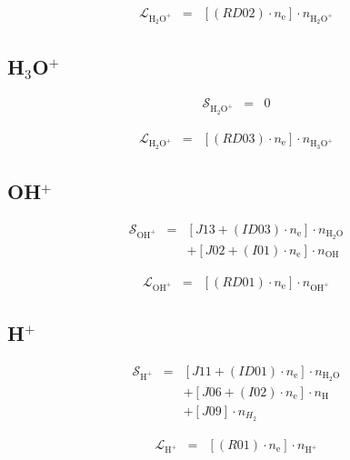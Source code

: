 \documentclass[12pt, letterpaper]{article}
\begin{document}
\begin{eqnarray}
\mathcal{L}_{\text{H}_{2}\text{O}^{+}} & = & \left[ \left( RD02 \right) \cdot n_{\text{e}} \right] \cdot n_{\text{H}_{2} \text{O}^{+}}
\end{eqnarray}

\subsection{H$_{3}$O$^{+}$}
\begin{eqnarray}
\mathcal{S}_{\text{H}_{2}\text{O}^{+}} & = & 0
\end{eqnarray}

\begin{eqnarray}
\mathcal{L}_{\text{H}_{2}\text{O}^{+}} & = & \left[ \left( RD03 \right) \cdot n_{\text{e}} \right] \cdot n_{\text{H}_{3} \text{O}^{+}}
\end{eqnarray}

\subsection{OH$^{+}$}
\begin{eqnarray}
\mathcal{S}_{\text{OH}^{+}} & = & \left[ J13 + \left( ID03 \right) \cdot n_{\text{e}} \right] \cdot n_{\text{H}_{2}\text{O}} \nonumber \\
& & + \left[ J02 + \left( I01 \right) \cdot n_{\text{e}} \right] \cdot n_{\text{OH}}
\end{eqnarray}

\begin{eqnarray}
\mathcal{L}_{\text{OH}^{+}} & = & \left[ \left( RD01 \right) \cdot n_{\text{e}} \right] \cdot n_{\text{OH}^{+}}
\end{eqnarray}

\subsection{H$^{+}$}
\begin{eqnarray}
\mathcal{S}_{\text{H}^{+}} & = & \left[ J11 + \left( ID01 \right) \cdot n_{\text{e}} \right] \cdot n_{\text{H}_{2}\text{O}} \nonumber \\
& & + \left[ J06 + \left( I02 \right) \cdot n_{\text{e}} \right] \cdot n_{\text{H}} \nonumber \\
& & + \left[ J09 \right] \cdot n_{H_{2}}
\end{eqnarray}

\begin{eqnarray}
\mathcal{L}_{\text{H}^{+}} & = & \left[ \left( R01 \right) \cdot n_{\text{e}} \right] \cdot n_{\text{H}^{+}}
\end{eqnarray}
\end{document}
